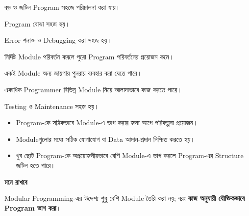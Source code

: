 
\begin{compacttwocolpoints}

\item বড় ও জটিল Program সহজে পরিচালনা করা যায়।

\item Program বোঝা সহজ হয়।

\item Error শনাক্ত ও Debugging করা সহজ হয়।

\item নির্দিষ্ট Module পরিবর্তন করলে পুরো Program পরিবর্তনের
প্রয়োজন কমে।

\item একই Module অন্য জায়গায় পুনরায় ব্যবহার করা যেতে পারে।

\item একাধিক Programmer বিভিন্ন Module নিয়ে আলাদাভাবে কাজ করতে পারে।

\item Testing ও Maintenance সহজ হয়।

\end{compacttwocolpoints}


\begin{itemize}

\item Program-কে সঠিকভাবে Module-এ ভাগ করার জন্য আগে পরিকল্পনা প্রয়োজন।

\item Moduleগুলোর মধ্যে সঠিক যোগাযোগ বা Data আদান-প্রদান নিশ্চিত করতে হয়।

\item খুব ছোট Program-কে অপ্রয়োজনীয়ভাবে বেশি Module-এ ভাগ করলে
Program-এর Structure জটিল হতে পারে।

\end{itemize}

\begin{rememberbox}

\textbf{\color{deepOrange}মনে রাখবে}

Modular Programming-এর উদ্দেশ্য শুধু বেশি Module তৈরি করা নয়;
বরং \textbf{কাজ অনুযায়ী যৌক্তিকভাবে Program ভাগ করা}।

\end{rememberbox}


